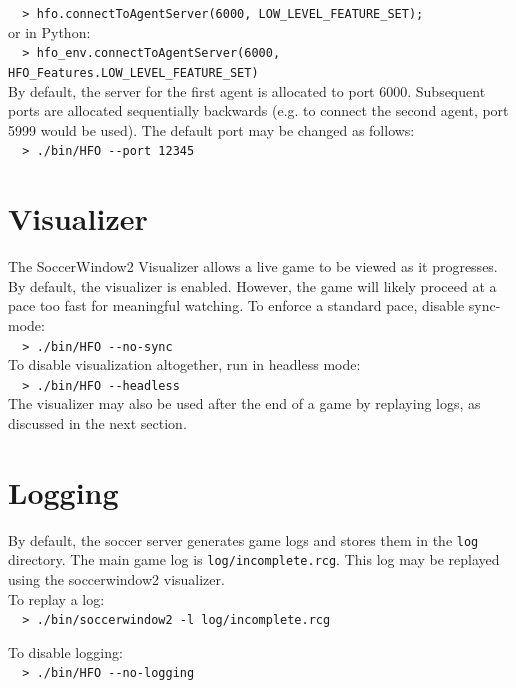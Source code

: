 \documentclass[12pt]{article}
\begin{document}
\noindent \verb+  > hfo.connectToAgentServer(6000, LOW_LEVEL_FEATURE_SET);+\\
or in Python:\\
\noindent \verb+  > hfo_env.connectToAgentServer(6000, HFO_Features.LOW_LEVEL_FEATURE_SET)+\\

By default, the server for the first agent is allocated to port
6000. Subsequent ports are allocated sequentially backwards (e.g. to
connect the second agent, port 5999 would be used). The default port
may be changed as follows:\\

\noindent \verb+  > ./bin/HFO --port 12345+

\section{Visualizer}

The SoccerWindow2 Visualizer allows a live game to be viewed as it
progresses. By default, the visualizer is enabled. However, the game
will likely proceed at a pace too fast for meaningful watching. To
enforce a standard pace, disable sync-mode:\\

\noindent \verb+  > ./bin/HFO --no-sync+\\

To disable visualization altogether, run in headless mode:\\

\noindent \verb+  > ./bin/HFO --headless+\\

The visualizer may also be used after the end of a game by replaying
logs, as discussed in the next section.

\section{Logging}

By default, the soccer server generates game logs and stores them in
the \verb+log+ directory. The main game log is
\verb+log/incomplete.rcg+. This log may be replayed using the
soccerwindow2 visualizer. \\

\noindent To replay a log: \\
\verb+  > ./bin/soccerwindow2 -l log/incomplete.rcg+

\noindent To disable logging:\\
\verb+  > ./bin/HFO --no-logging +
\end{document}
